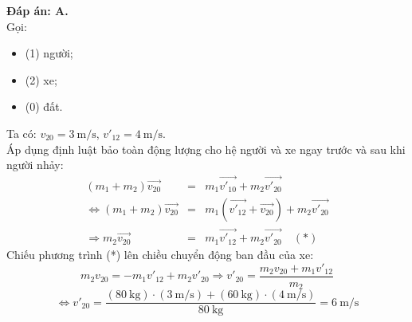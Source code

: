 \begin{enumerate}[label=\bfseries Câu \arabic*:, leftmargin=1.5cm]
	\hideall
	{	
		\textbf{Đáp án: A.}\\
		Gọi:
		\begin{itemize}
			\item (1) người;
			\item (2) xe;
			\item (0) đất.
		\end{itemize}
	Ta có: $v_{20}=\SI{3}{\meter/\second}$, $v'_{12}=\SI{4}{\meter/\second}$.\\
	Áp dụng định luật bảo toàn động lượng cho hệ người và xe ngay trước và sau khi người nhảy:
	\begin{eqnarray*}
		\left(m_1+m_2\right)\overrightarrow{v_{20}}&=&m_1\overrightarrow{v'_{10}} +m_2\overrightarrow{v'_{20}}\\
		\Leftrightarrow \left(m_1+m_2\right)\overrightarrow{v_{20}}&=&m_1\left(\overrightarrow{v'_{12}}+\overrightarrow{v_{20}}\right) +m_2\overrightarrow{v'_{20}}\\
		\Rightarrow m_2\overrightarrow{v_{20}}&=&m_1\overrightarrow{v'_{12}}+m_2\overrightarrow{v'_{20}} \quad (*)
	\end{eqnarray*}		
Chiếu phương trình (*) lên chiều chuyển động ban đầu của xe:
$$m_2v_{20}=-m_1v'_{12}+m_2v'_{20}\Rightarrow v'_{20}=\dfrac{m_2v_{20}+m_1v'_{12}}{m_2}$$
$$\Leftrightarrow v'_{20}=\dfrac{\left(\SI{80}{\kilogram}\right)\cdot\left(\SI{3}{\meter/\second}\right)+\left(\SI{60}{\kilogram}\right)\cdot\left(\SI{4}{\meter/\second}\right)}{\SI{80}{\kilogram}}=\SI{6}{\meter/\second}$$
	}
	

\end{enumerate}
